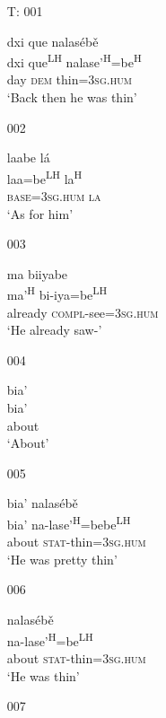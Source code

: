 

\begin{itemize}

\item[T: 001]
   
\glll dxi que nalas\'{e}b\v{e} \\
dxi que\textsuperscript{LH} nalase'\textsuperscript{H}=be\textsuperscript{H} \\
day \textsc{dem} thin=\textsc{3sg.hum} \\
\glt `Back then he was thin'


\item[002]
    
\glll laabe l\'{a} \\
laa=be\textsuperscript{LH} la\textsuperscript{H}  \\
 \textsc{base}=\textsc{3sg.hum} \textsc{la} \\
\glt `As for him'
 

\item[003]
   
\glll ma biiyabe  \\
ma'\textsuperscript{H} bi-iya=be\textsuperscript{LH}  \\
already \textsc{compl}-see=\textsc{3sg.hum}  \\
\glt `He already saw-'
 

\item[004]
   
\glll bia' \\
bia' \\
about \\
\glt `About'
 

\item[005]
   
\glll bia' nalas\'{e}b\v{e} \\
bia' na-lase'\textsuperscript{H}=bebe\textsuperscript{LH}  \\
about \textsc{stat}-thin=\textsc{3sg.hum} \\
\glt `He was pretty thin' 
 

\item[006]
   
\glll nalas\'{e}b\v{e} \\
na-lase'\textsuperscript{H}=be\textsuperscript{LH}  \\
about \textsc{stat}-thin=\textsc{3sg.hum} \\
\glt `He was thin'
 

\item[007]
   

\end{itemize}
